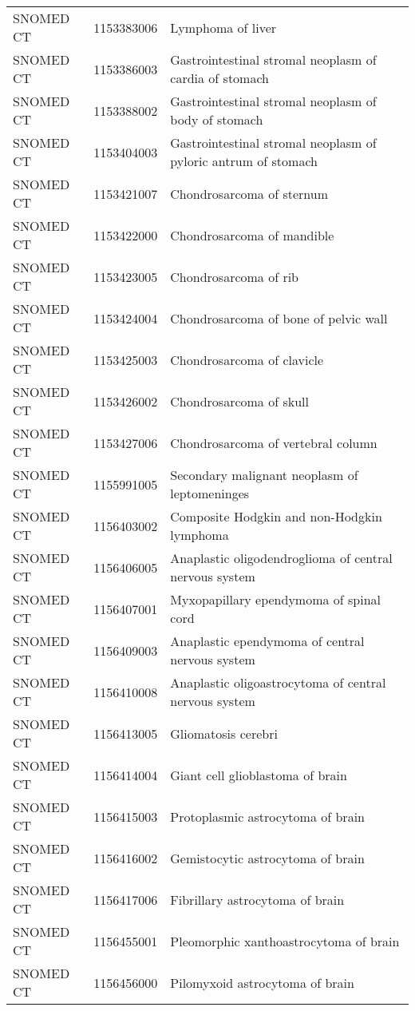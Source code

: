 \begin{longtable}{p{}p{}p{}}
  SNOMED CT & 1153383006 & Lymphoma of liver \\ 
  SNOMED CT & 1153386003 & Gastrointestinal stromal neoplasm of cardia of stomach \\ 
  SNOMED CT & 1153388002 & Gastrointestinal stromal neoplasm of body of stomach \\ 
  SNOMED CT & 1153404003 & Gastrointestinal stromal neoplasm of pyloric antrum of stomach \\ 
  SNOMED CT & 1153421007 & Chondrosarcoma of sternum \\ 
  SNOMED CT & 1153422000 & Chondrosarcoma of mandible \\ 
  SNOMED CT & 1153423005 & Chondrosarcoma of rib \\ 
  SNOMED CT & 1153424004 & Chondrosarcoma of bone of pelvic wall \\ 
  SNOMED CT & 1153425003 & Chondrosarcoma of clavicle \\ 
  SNOMED CT & 1153426002 & Chondrosarcoma of skull \\ 
  SNOMED CT & 1153427006 & Chondrosarcoma of vertebral column \\ 
  SNOMED CT & 1155991005 & Secondary malignant neoplasm of leptomeninges \\ 
  SNOMED CT & 1156403002 & Composite Hodgkin and non-Hodgkin lymphoma \\ 
  SNOMED CT & 1156406005 & Anaplastic oligodendroglioma of central nervous system \\ 
  SNOMED CT & 1156407001 & Myxopapillary ependymoma of spinal cord \\ 
  SNOMED CT & 1156409003 & Anaplastic ependymoma of central nervous system \\ 
  SNOMED CT & 1156410008 & Anaplastic oligoastrocytoma of central nervous system \\ 
  SNOMED CT & 1156413005 & Gliomatosis cerebri \\ 
  SNOMED CT & 1156414004 & Giant cell glioblastoma of brain \\ 
  SNOMED CT & 1156415003 & Protoplasmic astrocytoma of brain \\ 
  SNOMED CT & 1156416002 & Gemistocytic astrocytoma of brain \\ 
  SNOMED CT & 1156417006 & Fibrillary astrocytoma of brain \\ 
  SNOMED CT & 1156455001 & Pleomorphic xanthoastrocytoma of brain \\ 
  SNOMED CT & 1156456000 & Pilomyxoid astrocytoma of brain \\ 

\end{longtable}
